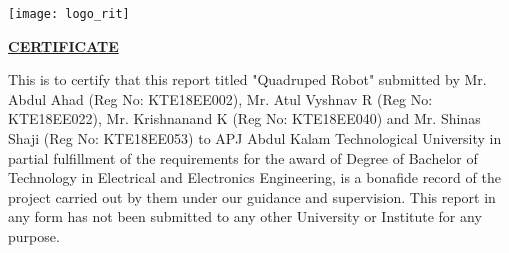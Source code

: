 \begin{center}
    \begin{center}   
        \texttt{[image: logo\_rit]}
    \end{center}
\vspace{0.5cm}
    
\vspace{2 cm}

\textbf{\underline{CERTIFICATE}}\\
\vspace{0.5cm}
\end{center}

This is to certify that this report titled "Quadruped Robot" submitted by Mr. Abdul Ahad (Reg No: KTE18EE002), Mr. Atul Vyshnav R (Reg No: KTE18EE022), Mr. Krishnanand K (Reg No: KTE18EE040) and Mr. Shinas Shaji (Reg No: KTE18EE053) to APJ Abdul Kalam Technological University in partial fulfillment of the requirements for the award of Degree of Bachelor of Technology in Electrical and Electronics Engineering, is a bonafide record of the project carried out by them under our guidance and supervision. This report in any form has not been submitted to any other University or Institute for any purpose. 